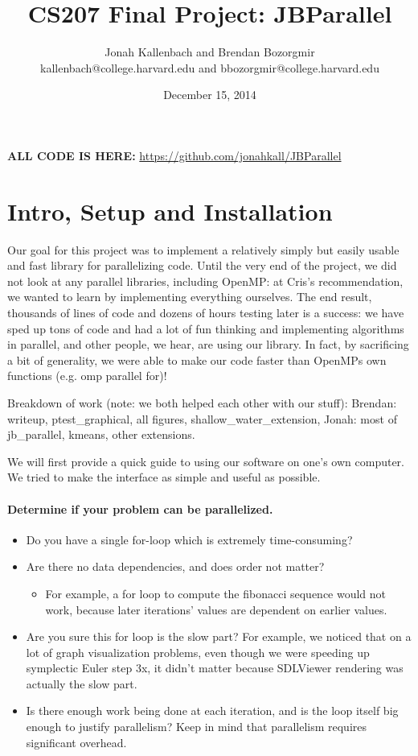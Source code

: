 \documentclass{article}
\title{CS207 Final Project: JBParallel}
\author{Jonah Kallenbach and Brendan Bozorgmir
\\kallenbach@college.harvard.edu and bbozorgmir@college.harvard.edu}
\date{December 15, 2014}
\begin{document}
\maketitle

\textbf{ALL CODE IS HERE:} \url{https://github.com/jonahkall/JBParallel}

\section{Intro, Setup and Installation}

Our goal for this project was to implement a relatively simply but easily usable and fast library for parallelizing code.  Until the very end of the project, we did not look at any parallel libraries, including OpenMP: at Cris's recommendation, we wanted to learn by implementing everything ourselves.  The end result, thousands of lines of code and dozens of hours testing later is a success: we have sped up tons of code and had a lot of fun thinking and implementing algorithms in parallel, and other people, we hear, are using our library.  In fact, by sacrificing a bit of generality, we were able to make our code faster than OpenMPs own functions (e.g. omp parallel for)!

Breakdown of work (note: we both helped each other with our stuff): Brendan: writeup, ptest\_graphical, all figures, shallow\_water\_extension, Jonah: most of jb\_parallel, kmeans, other extensions.

We will first provide a quick guide to using our software on one's own computer.  We tried to make the interface as simple and useful as possible.
 
\paragraph*{Determine if your problem can be parallelized.}
\begin{itemize}
\item{Do you have a single for-loop which is extremely time-consuming?}
\item Are there no data dependencies, and does order not matter?
\begin{itemize}
	\item For example, a for loop to compute the fibonacci sequence would not work, because later iterations' values are dependent on earlier values.
\end{itemize}

\item Are you sure this for loop is the slow part? For example, we noticed that on a lot of graph visualization problems, even though we were speeding up symplectic Euler step 3x, it didn't matter because SDLViewer rendering was actually the slow part.
\item Is there enough work being done at each iteration, and is the loop itself big enough to justify parallelism? Keep in mind that parallelism requires significant overhead.
\end{itemize}
\end{document}

